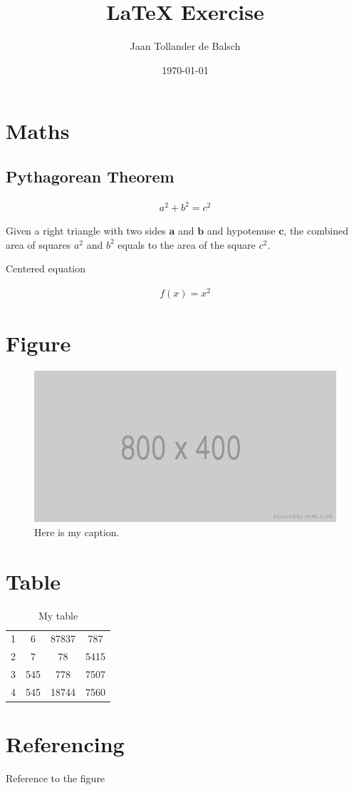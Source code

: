 \documentclass{article}
\title{LaTeX Exercise}
\author{Jaan Tollander de Balsch}
\date{\today}
\begin{document}
\clearpage
\maketitle
\thispagestyle{empty}
\newpage


\thispagestyle{empty}
\tableofcontents{}
\newpage


\section{Maths}
\setcounter{page}{1}

\subsection{Pythagorean Theorem}
\begin{align}
a^2+b^2=c^2
\end{align}

Given a right triangle with two sides $\mathbf{a}$ and $\mathbf{b}$ and hypotenuse $\mathbf{c}$, the combined area of squares $a^2$ and $b^2$ equals to the area of the square $c^2$.

Centered equation

\begin{align}
f(x)=x^2
\end{align}


\section{Figure}
\begin{figure}[h]
\includegraphics[width=\textwidth]{800x400.png}
    \caption{Here is my caption. \cite{htmlcom}}
\end{figure}


\section{Table}
\begin{table}[h]
\centering
\begin{tabular}{|c c c c|} 
 \hline
 1 & 6 & 87837 & 787 \\ 
 2 & 7 & 78 & 5415 \\
 3 & 545 & 778 & 7507 \\
 4 & 545 & 18744 & 7560 \\
 \hline
\end{tabular}
\caption{My table}
\label{table:1}
\end{table}


\section{Referencing}
Reference to the figure \cite{htmlcom}

\printbibliography
\end{document}
